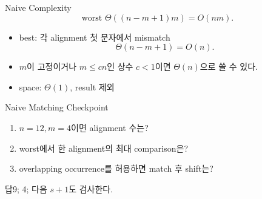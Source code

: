 \begin{frame}{Naive Complexity}
\[
\text{worst } \Theta((n-m+1)m)=O(nm).
\]
\begin{itemize}
\item best: 각 alignment 첫 문자에서 mismatch
\[
\Theta(n-m+1)=O(n).
\]
\item \(m\)이 고정이거나 \(m\le cn\)인 상수 \(c<1\)이면 \(\Theta(n)\)으로 쓸 수 있다.
\item space: \(\Theta(1)\), result 제외
\end{itemize}
\end{frame}
\begin{frame}{Naive Matching Checkpoint}
\begin{enumerate}\item \(n=12,m=4\)이면 alignment 수는?\item worst에서 한 alignment의 최대 comparison은?\item overlapping occurrence를 허용하면 match 후 shift는?\end{enumerate}
\begin{exampleblock}{답}9; 4; 다음 \(s+1\)도 검사한다.\end{exampleblock}
\end{frame}
